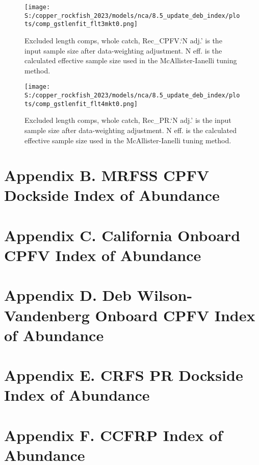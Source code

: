 \documentclass[11pt,
  english,
  letterpaper,
]{article}
\begin{document}
\begin{figure}
\centering
\texttt{[image: S:/copper\_rockfish\_2023/models/nca/8.5\_update\_deb\_index/plots/comp\_gstlenfit\_flt3mkt0.png]}
\caption{Excluded length comps, whole catch, Rec\_CPFV.`N adj.' is the input sample size after data-weighting adjustment. N eff. is the calculated effective sample size used in the McAllister-Ianelli tuning method.\label{fig:comp_gstlenfit_flt3mkt0}}
\end{figure}

\begin{figure}
\centering
\texttt{[image: S:/copper\_rockfish\_2023/models/nca/8.5\_update\_deb\_index/plots/comp\_gstlenfit\_flt4mkt0.png]}
\caption{Excluded length comps, whole catch, Rec\_PR.`N adj.' is the input sample size after data-weighting adjustment. N eff. is the calculated effective sample size used in the McAllister-Ianelli tuning method.\label{fig:comp_gstlenfit_flt4mkt0}}
\end{figure}

\newpage

\hypertarget{mrfss-cpfv-index}{%
\section{Appendix B. MRFSS CPFV Dockside Index of Abundance}\label{mrfss-cpfv-index}}

\hypertarget{onboard-cpfv-index}{%
\section{Appendix C. California Onboard CPFV Index of Abundance}\label{onboard-cpfv-index}}

\hypertarget{dwv-cpfv-index}{%
\section{Appendix D. Deb Wilson-Vandenberg Onboard CPFV Index of Abundance}\label{dwv-cpfv-index}}

\hypertarget{crfs-pr-index}{%
\section{Appendix E. CRFS PR Dockside Index of Abundance}\label{crfs-pr-index}}

\hypertarget{ccfrp-index}{%
\section{Appendix F. CCFRP Index of Abundance}\label{ccfrp-index}}
\end{document}
